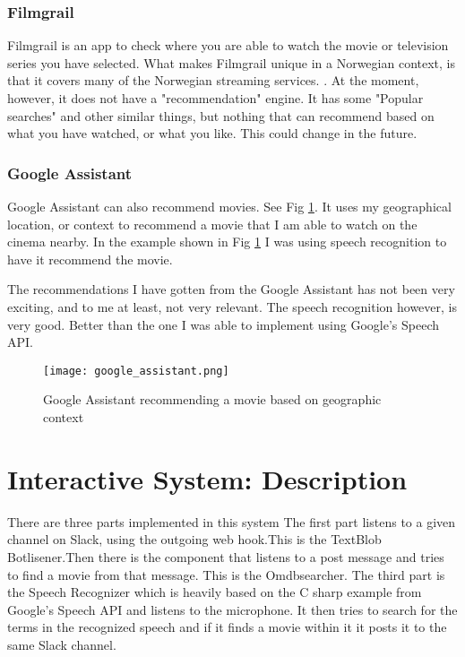 \documentclass[11pt,fleqn]{book} %
\begin{document}
\subsection{Filmgrail}
Filmgrail is an app to check where you are able to watch the movie or television series you have selected. What makes Filmgrail unique in a Norwegian context, is that it covers many of the Norwegian streaming services. \cite{AmundsenAppenAftenposten}.
At the moment, however, it does not have a "recommendation" engine. It has some "Popular searches" and other similar things, but nothing that can recommend based on what you have watched, or what you like. This could change in the future.
\subsection{Google Assistant}
Google Assistant can also recommend movies. See Fig \ref{fig:google_assistant}. It uses my geographical location, or context to recommend a movie that I am able to watch on the cinema nearby. In the example shown in Fig \ref{fig:google_assistant} I was using speech recognition to have it recommend the movie.

The recommendations I have gotten from the Google Assistant has not been very exciting, and to me at least, not very relevant. The speech recognition however, is very good. Better than the one I was able to implement using Google's Speech API.

\begin{figure}[]
  \centering
   \texttt{[image: google\_assistant.png]}
  \caption{Google Assistant recommending a movie based on geographic context}
  \label{fig:google_assistant}
\end{figure}



\chapter{Interactive System: Description}
There are three parts implemented in this system
The first part listens to a given channel on Slack, using the outgoing web hook\cite{SlackOutgoingSlack}.This is the TextBlob Botlisener.Then there is the component that listens to a post message and tries to find a movie from that message. This is the Omdbsearcher.
The third part is the Speech Recognizer which is heavily based on the C sharp example from Google's Speech API \cite{GoogleCloudPlatformSpeechPlatform} and listens to the microphone. It then tries to search for the terms in the recognized speech and if it finds a movie within it it posts it to the same Slack channel.
\end{document}
